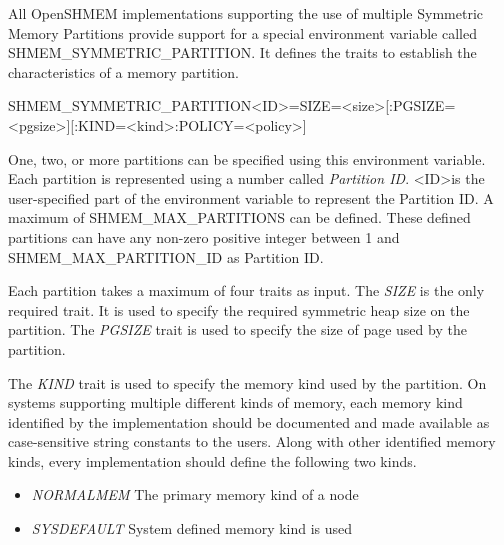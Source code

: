 All OpenSHMEM implementations supporting the use of multiple Symmetric Memory
Partitions provide support for a special environment variable called
SHMEM\_SYMMETRIC\_PARTITION. It defines the traits to establish the
characteristics of a memory partition. %

\begin{envvardefinition}
\begin{envvarname}
SHMEM_SYMMETRIC_PARTITION<ID>=SIZE=<size>[:PGSIZE=<pgsize>][:KIND=<kind>:POLICY=<policy>]
\end{envvarname}

\begin{envvararguments}
\end{envvararguments}

One, two, or more partitions can be specified using this environment variable.
Each partition is represented using a number called \emph{Partition ID}.
\textless ID\textgreater is the user-specified part of the environment variable
to represent the Partition ID. A maximum of SHMEM\_MAX\_PARTITIONS can be
defined. These defined partitions can have any non-zero positive integer
between 1 and SHMEM\_MAX\_PARTITION\_ID as Partition ID.

Each partition takes a maximum of four traits as input. The \emph{SIZE} is the
only required trait. It is used to specify the required symmetric heap size on
the partition. The \emph{PGSIZE} trait is used to specify the size of page used
by the partition.

The \emph{KIND} trait is used to specify the memory kind used by the partition.
On systems supporting multiple different kinds of memory, each memory kind
identified by the implementation should be documented and made available as
case-sensitive string constants to the users. Along with other identified
memory kinds, every implementation should define the following two kinds.
\begin{itemize}
\item \emph{NORMALMEM} The primary memory kind of a node
\item \emph{SYSDEFAULT} System defined memory kind is used
\end{itemize}


\end{envvardefinition}
